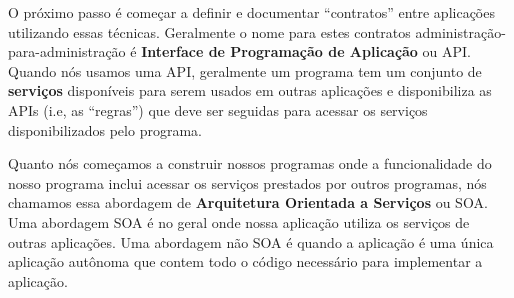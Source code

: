 O próximo passo é começar a definir e documentar ``contratos'' entre
aplicações utilizando essas técnicas. Geralmente o nome para estes contratos
administração-para-administração é {\bf Interface de Programação de 
Aplicação} ou API. Quando nós usamos uma API, geralmente um programa tem 
um conjunto de {\bf serviços} disponíveis para serem usados em outras
aplicações e disponibiliza as APIs (i.e, as ``regras'') que deve ser
seguidas para acessar os serviços disponibilizados pelo programa.

Quanto nós começamos a construir nossos programas onde a funcionalidade
do nosso programa inclui acessar os serviços prestados por outros 
programas, nós chamamos essa abordagem de {\bf Arquitetura Orientada
a Serviços} ou SOA. Uma abordagem SOA é no geral onde nossa aplicação
utiliza os serviços de outras aplicações. Uma abordagem não SOA é quando
a aplicação é uma única aplicação autônoma que contem todo o código
necessário para implementar a aplicação.

